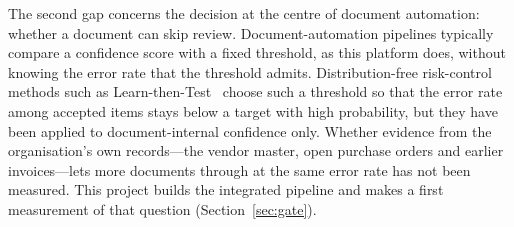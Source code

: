 The second gap concerns the decision at the centre of document automation: whether a document can skip review. Document-automation pipelines typically compare a confidence score with a fixed threshold, as this platform does, without knowing the error rate that the threshold admits. Distribution-free risk-control methods such as Learn-then-Test~\cite{angelopoulos2021ltt} choose such a threshold so that the error rate among accepted items stays below a target with high probability, but they have been applied to document-internal confidence only. Whether evidence from the organisation's own records---the vendor master, open purchase orders and earlier invoices---lets more documents through at the same error rate has not been measured. This project builds the integrated pipeline and makes a first measurement of that question (Section~\ref{sec:gate}).
